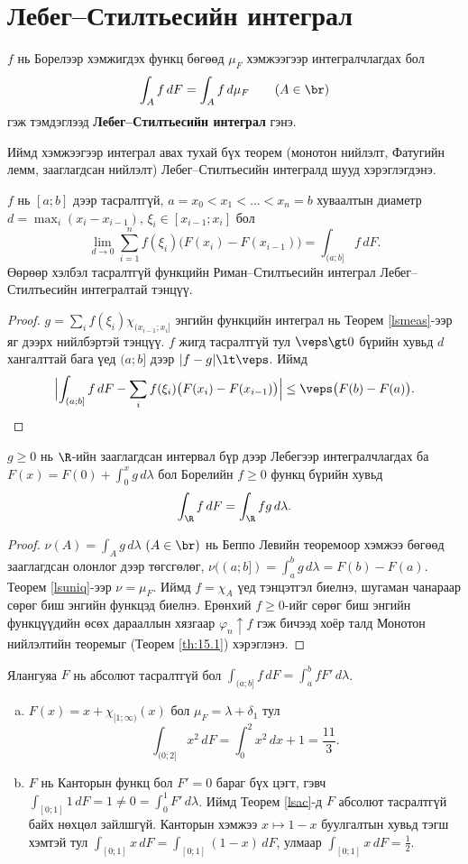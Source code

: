 \section{Лебег--Стилтьесийн интеграл}
\begin{dfn}\label{lsint}
$f$ нь Борелээр хэмжигдэх функц бөгөөд $\mu_F$ хэмжээгээр интегралчлагдах бол
$$\int_Af\,dF=\int_Af\,d\mu_F\qquad(A\in\br)$$
гэж тэмдэглээд \textbf{Лебег--Стилтьесийн интеграл} гэнэ.
\end{dfn}
Иймд хэмжээгээр интеграл авах тухай бүх теорем (монотон нийлэлт, Фатугийн лемм, зааглагдсан нийлэлт) Лебег--Стилтьесийн интегралд шууд хэрэглэгдэнэ.

\begin{thm}\label{lsrs}
$f$ нь $[a;b]$ дээр тасралтгүй, $a=x_0\lt x_1\lt\ldots\lt x_n=b$ хуваалтын диаметр $d=\max_i(x_i-x_{i-1})$, $\xi_i\in[x_{i-1};x_i]$ бол
$$\lim_{d\to 0}\sum_{i=1}^{n}f(\xi_i)\bigl(F(x_i)-F(x_{i-1})\bigr)=\int_{(a;b]}f\,dF.$$
Өөрөөр хэлбэл тасралтгүй функцийн Риман--Стилтьесийн интеграл Лебег--Стилтьесийн интегралтай тэнцүү.
\end{thm}
\begin{proof}
$g=\sum_if(\xi_i)\chi_{(x_{i-1};x_i]}$ энгийн функцийн интеграл нь Теорем \ref{lsmeas}-ээр яг дээрх нийлбэртэй тэнцүү. $f$ жигд тасралтгүй тул $\veps\gt 0$ бүрийн хувьд $d$ хангалттай бага үед $(a;b]$ дээр $|f-g|\lt\veps$. Иймд
$$\Bigl|\int_{(a;b]}f\,dF-\sum_if(\xi_i)\bigl(F(x_i)-F(x_{i-1})\bigr)\Bigr|\leq\veps\bigl(F(b)-F(a)\bigr).$$
\end{proof}

\begin{thm}\label{lsac}
$g\geq 0$ нь $\R$-ийн зааглагдсан интервал бүр дээр Лебегээр интегралчлагдах ба $F(x)=F(0)+\int_0^xg\,d\lambda$ бол Борелийн $f\geq 0$ функц бүрийн хувьд
$$\int_{\R}f\,dF=\int_{\R}fg\,d\lambda.$$
\end{thm}
\begin{proof}
$\nu(A)=\int_Ag\,d\lambda$ $(A\in\br)$ нь Беппо Левийн теоремоор хэмжээ бөгөөд зааглагдсан олонлог дээр төгсгөлөг, $\nu((a;b])=\int_a^bg\,d\lambda=F(b)-F(a)$. Теорем \ref{lsuniq}-ээр $\nu=\mu_F$. Иймд $f=\chi_A$ үед тэнцэтгэл биелнэ, шугаман чанараар сөрөг биш энгийн функцэд биелнэ. Ерөнхий $f\geq 0$-ийг сөрөг биш энгийн функцүүдийн өсөх дарааллын хязгаар $\varphi_n\uparrow f$ гэж бичээд хоёр талд Монотон нийлэлтийн теоремыг (Теорем \ref{th:15.1}) хэрэглэнэ.
\end{proof}
Ялангуяа $F$ нь абсолют тасралтгүй бол $\int_{(a;b]}f\,dF=\int_a^bf F'\,d\lambda$.

\begin{exm}
\begin{enumerate}[a)]
\item $F(x)=x+\chi_{[1;\infty)}(x)$ бол $\mu_F=\lambda+\delta_1$ тул
$$\int_{(0;2]}x^2\,dF=\int_0^2x^2\,dx+1=\frac{11}{3}.$$
\item $F$ нь Канторын функц бол $F'=0$ бараг бүх цэгт, гэвч $\int_{[0;1]}1\,dF=1\neq 0=\int_0^1F'\,d\lambda$. Иймд Теорем \ref{lsac}-д $F$ абсолют тасралтгүй байх нөхцөл зайлшгүй. Канторын хэмжээ $x\mapsto 1-x$ буулгалтын хувьд тэгш хэмтэй тул $\int_{[0;1]}x\,dF=\int_{[0;1]}(1-x)\,dF$, улмаар $\int_{[0;1]}x\,dF=\frac12$.
\end{enumerate}
\end{exm}
